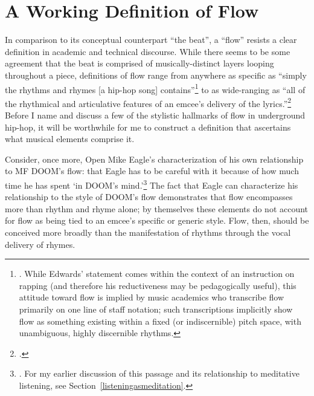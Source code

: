 \onehalfspacing
\label{chapter3}
\section{A Working Definition of Flow}

In comparison to its conceptual counterpart ``the beat'', a ``flow'' resists a clear 
definition in academic and technical discourse. While there seems to be some agreement
that the beat is comprised of musically-distinct layers looping throughout a piece, 
definitions of flow range from anywhere as specific as ``simply the rhythms and rhymes
[a hip-hop song] contains''\footnote{
    \autocite[63]{pauledwardsHowRapArt2009}. While Edwards' statement comes within the 
    context of an instruction on rapping (and therefore his reductiveness may be 
    pedagogically useful), this attitude toward flow is implied by music academics who 
    transcribe flow primarily on one line of staff notation; such transcriptions implicitly
    show flow as something existing within a fixed (or indiscernible) pitch space, with 
    unambiguous, highly discernible rhythms.} 
to as wide-ranging as ``all of the rhythmical and articulative features of an emcee's 
delivery of the lyrics.''\footnote{
    \cite{kyleadamsMetricalTechniquesFlow2009}.} 
Before I name and discuss a few of the stylistic hallmarks of flow in underground hip-hop,
it will be worthwhile for me to construct a definition that ascertains what musical elements
comprise it.

Consider, once more, Open Mike Eagle's characterization of his own relationship to MF 
DOOM's flow: that Eagle has to be careful with it because of how much time he has spent
`in DOOM's mind.'\footnote{
    \cite{estellecaswellRappingDeconstructedBest2016}. For my earlier discussion of this
    passage and its relationship to meditative listening,  see Section~\ref{listeningasmeditation}.} 
The fact that Eagle can characterize his relationship to the style of DOOM's flow demonstrates
that flow encompasses more than rhythm and rhyme alone; by themselves these elements do not
account for flow as being tied to an emcee's specific or generic style. Flow, then, should
be conceived more broadly than the manifestation of rhythms through the vocal delivery of
rhymes.

